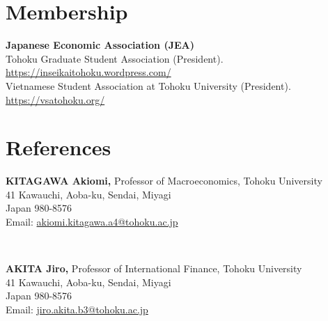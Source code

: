 \documentclass[margin,line]{res}
\begin{document}
\begin{resume}
\section{\sc Membership}
{\bf Japanese Economic Association (JEA)} \\
Tohoku Graduate Student Association (President). \url{https://inseikaitohoku.wordpress.com/} \\
Vietnamese Student Association at Tohoku University (President). \url{https://vsatohoku.org/}

\newpage







\section{\sc References}
\vspace*{.05in}
\parbox{\textwidth}{
{\bf KITAGAWA Akiomi,} Professor of Macroeconomics, Tohoku University \\
41 Kawauchi, Aoba-ku, Sendai, Miyagi \\
Japan 980-8576 \\
Email: \href{mailto:akiomi.kitagawa.a4@tohoku.ac.jp}{akiomi.kitagawa.a4@tohoku.ac.jp}} \\

\par
\parbox{\textwidth}{
{\bf AKITA Jiro,} Professor of International Finance, Tohoku University\\
41 Kawauchi, Aoba-ku, Sendai, Miyagi \\
Japan 980-8576 \\
Email: \href{mailto:jiro.akita.b3@tohoku.ac.jp}{jiro.akita.b3@tohoku.ac.jp}}


\end{resume}
\end{document}
